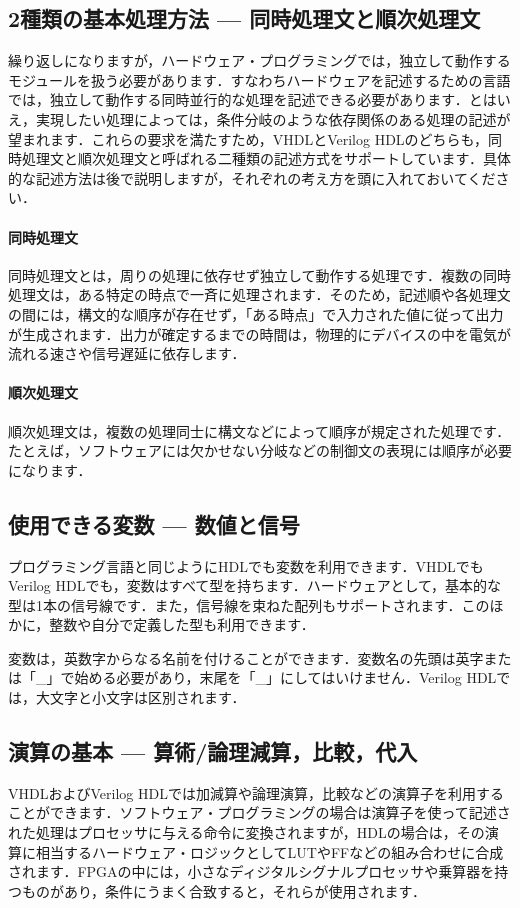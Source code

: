 \documentclass[a4paper,dvipdfmx]{jsarticle}
\begin{document}
\subsection{2種類の基本処理方法 --- 同時処理文と順次処理文}
繰り返しになりますが，ハードウェア・プログラミングでは，独立して動作するモジュールを扱う必要があります．すなわちハードウェアを記述するための言語では，独立して動作する同時並行的な処理を記述できる必要があります．とはいえ，実現したい処理によっては，条件分岐のような依存関係のある処理の記述が望まれます．これらの要求を満たすため，VHDLとVerilog HDLのどちらも，同時処理文と順次処理文と呼ばれる二種類の記述方式をサポートしています．具体的な記述方法は後で説明しますが，それぞれの考え方を頭に入れておいてください．

\paragraph{同時処理文}
同時処理文とは，周りの処理に依存せず独立して動作する処理です．複数の同時処理文は，ある特定の時点で一斉に処理されます．そのため，記述順や各処理文の間には，構文的な順序が存在せず，「ある時点」で入力された値に従って出力が生成されます．出力が確定するまでの時間は，物理的にデバイスの中を電気が流れる速さや信号遅延に依存します．

\paragraph{順次処理文}
順次処理文は，複数の処理同士に構文などによって順序が規定された処理です．たとえば，ソフトウェアには欠かせない分岐などの制御文の表現には順序が必要になります．

\subsection{使用できる変数 --- 数値と信号}
プログラミング言語と同じようにHDLでも変数を利用できます．VHDLでもVerilog HDLでも，変数はすべて型を持ちます．ハードウェアとして，基本的な型は1本の信号線です．また，信号線を束ねた配列もサポートされます．このほかに，整数や自分で定義した型も利用できます．

変数は，英数字からなる名前を付けることができます．変数名の先頭は英字または「\_」で始める必要があり，末尾を「\_」にしてはいけません．Verilog HDLでは，大文字と小文字は区別されます．

\subsection{演算の基本 --- 算術/論理減算，比較，代入}
VHDLおよびVerilog HDLでは加減算や論理演算，比較などの演算子を利用することができます．ソフトウェア・プログラミングの場合は演算子を使って記述された処理はプロセッサに与える命令に変換されますが，HDLの場合は，その演算に相当するハードウェア・ロジックとしてLUTやFFなどの組み合わせに合成されます．FPGAの中には，小さなディジタルシグナルプロセッサや乗算器を持つものがあり，条件にうまく合致すると，それらが使用されます．
\end{document}
